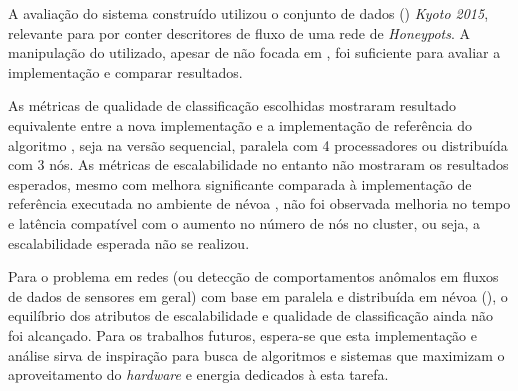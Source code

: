 A avaliação do sistema construído utilizou o conjunto de dados (\dataset)
\emph{Kyoto 2015}, relevante para \nids por conter descritores de fluxo de uma
rede de \emph{Honeypots}.
A manipulação do \dataset utilizado, apesar de não focada em \nids, foi
suficiente para avaliar a implementação e comparar resultados.


As métricas de qualidade de classificação escolhidas mostraram resultado
equivalente entre a nova implementação e a implementação de referência do
algoritmo \minas, seja na versão sequencial, paralela com 4 processadores ou
distribuída com 3 nós.
As métricas de escalabilidade no entanto não mostraram os resultados esperados,
mesmo com melhora significante comparada à implementação de referência executada
no ambiente de névoa \iot, não foi observada melhoria no tempo e latência
compatível com o aumento no número de nós no cluster, ou seja, a escalabilidade
esperada não se realizou.






Para o problema \nids em redes \iot (ou detecção de comportamentos anômalos em
fluxos de dados de sensores \iot em geral) com base em \nd paralela e
distribuída em névoa (\fog), o equilíbrio dos atributos de escalabilidade e
qualidade de classificação ainda não foi alcançado.
Para os trabalhos futuros, espera-se que esta implementação e análise sirva de
inspiração para busca de algoritmos e sistemas que maximizam o aproveitamento do
\emph{hardware} e energia dedicados à esta tarefa.

